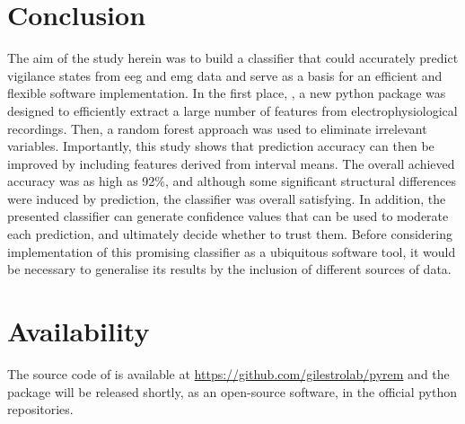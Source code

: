 \section*{Conclusion}

The aim of the study herein was to build a classifier that could accurately predict vigilance states from \gls{eeg} and \gls{emg} data
and serve as a basis for an efficient and flexible software implementation.
In the first place, \pr{}, a new python package was designed to efficiently extract a large number of features from electrophysiological recordings.
Then, a random forest approach was used to eliminate irrelevant variables.
Importantly, this study shows that prediction accuracy can then be improved by including features derived from interval means.
The overall achieved accuracy was as high as 92\%, and although some significant structural differences were induced by prediction,
the classifier was overall satisfying.
In addition, the presented classifier can generate confidence values that can be used to moderate each prediction, and ultimately decide whether to trust them.
Before considering implementation of this promising classifier as a ubiquitous software tool,
it would be necessary to generalise its results by the inclusion of different sources of data.

\section*{Availability}
The source code of \pr{} is available at \href{https://github.com/gilestrolab/pyrem}{https://github.com/gilestrolab/pyrem}
and the package will be released shortly, as an open-source software, in the official python repositories.



